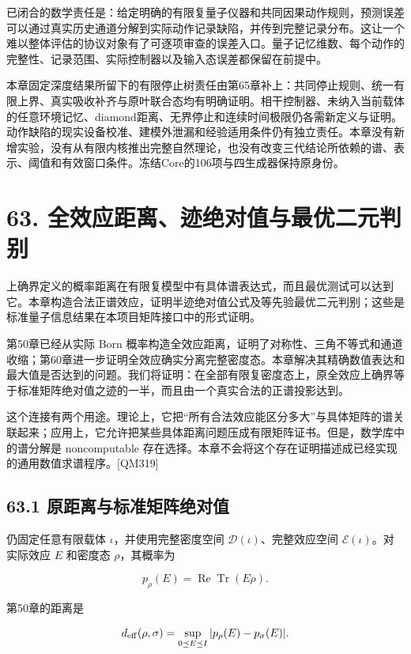 \documentclass[
  11pt,
  oneside]{book}
\begin{document}
已闭合的数学责任是：给定明确的有限复量子仪器和共同因果动作规则，预测误差可以通过真实历史通道分解到实际动作记录缺陷，并传到完整记录分布。这让一个难以整体评估的协议对象有了可逐项审查的误差入口。量子记忆维数、每个动作的完整性、记录范围、实际控制器以及输入态误差都保留在前提中。

本章固定深度结果所留下的有限停止树责任由第65章补上：共同停止规则、统一有限上界、真实吸收补齐与原叶联合态均有明确证明。相干控制器、未纳入当前载体的任意环境记忆、diamond距离、无界停止和连续时间极限仍各需新定义与证明。动作缺陷的现实设备校准、建模外泄漏和经验适用条件仍有独立责任。本章没有新增实验，没有从有限内核推出完整自然理论，也没有改变三代结论所依赖的谱、表示、阈值和有效窗口条件。冻结Core的106项与四生成器保持原身份。

\chapter{63. 全效应距离、迹绝对值与最优二元判别}\label{ch-63}\hypertarget{ch-63}{}

上确界定义的概率距离在有限复模型中有具体谱表达式，而且最优测试可以达到它。本章构造合法正谱效应，证明半迹绝对值公式及等先验最优二元判别；这些是标准量子信息结果在本项目矩阵接口中的形式证明。

第50章已经从实际 Born
概率构造全效应距离，证明了对称性、三角不等式和通道收缩；第60章进一步证明全效应确实分离完整密度态。本章解决其精确数值表达和最大值是否达到的问题。我们将证明：在全部有限复密度态上，原全效应上确界等于标准矩阵绝对值之迹的一半，而且由一个真实合法的正谱投影达到。

这个连接有两个用途。理论上，它把``所有合法效应能区分多大''与具体矩阵的谱关联起来；应用上，它允许把某些具体距离问题压成有限矩阵证书。但是，数学库中的谱分解是
noncomputable
存在选择。本章不会将这个存在证明描述成已经实现的通用数值求谱程序。{[}QM319{]}

\section{63.1 原距离与标准矩阵绝对值}

仍固定任意有限载体 \(\iota\)，并使用完整密度空间
\(\mathcal D(\iota)\)、完整效应空间 \(\mathcal E(\iota)\)。对实际效应
\(E\) 和密度态 \(\rho\)，其概率为

\[
p_\rho(E)=\operatorname{Re}\operatorname{Tr}(E\rho).
\]

第50章的距离是

\[
d_{\rm eff}(\rho,\sigma)
=\sup_{0\preceq E\preceq I}|p_\rho(E)-p_\sigma(E)|.
\]
\end{document}
